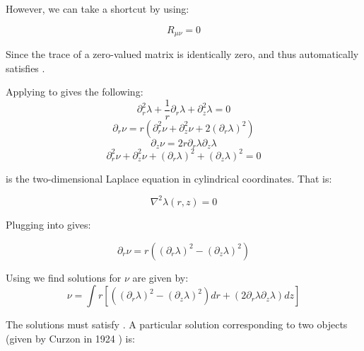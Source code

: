 \documentclass[12pt]{article}
\begin{document}
\begin{appendices}
However, we can take a shortcut by using:

\begin{equation}
R_{\mu\nu}=0
\label{eq:vacuum-solutions}
\end{equation}

Since the trace of a zero-valued matrix is identically zero, and thus  automatically satisfies .

Applying  to  gives the following:
\begin{equation}
\partial^{2}_{r}\lambda+\frac{1}{r}\partial_{r}\lambda+\partial^{2}_{z}\lambda=0\label{eq:laplace}
\end{equation}
\begin{equation}
\partial_{r}\nu=r\left(\partial^{2}_{r}\nu+\partial^{2}_{z}\nu+2\left(\partial_{r}\lambda\right)^{2}\right)\label{eq:R_rr=0}
\end{equation}
\begin{equation}
\partial_{z}\nu=2r\partial_{r}\lambda\partial_{z}\lambda\label{eq:nu_z}
\end{equation}
\begin{equation}
\partial^{2}_{r}\nu+\partial^{2}_{z}\nu+\left(\partial_{r}\lambda\right)^{2}+\left(\partial_{z}\lambda\right)^{2}=0\label{eq:R_phiphi=0}
\end{equation}

 is the two-dimensional Laplace equation in cylindrical coordinates. That is:

\begin{equation}
\nabla^2\lambda(r,z)=0
\end{equation}

Plugging  into  gives:

\begin{equation}
\partial_{r}\nu=r\left(\left(\partial_{r}\lambda\right)^{2}-\left(\partial_{z}\lambda\right)^{2}\right)\label{eq:nu_r}
\end{equation}

Using  we find solutions for $\nu$ are given by:
\begin{equation}
\nu=\int r[\left(\left(\partial_{r}\lambda\right)^{2}-\left(\partial_{z}\lambda\right)^{2}\right)dr+\left(2\partial_{r}\lambda\partial_{z}\lambda\right)dz]
\end{equation}

The solutions must satisfy . A particular solution corresponding to two objects (given by Curzon in 1924 \cite{curzon1924} ) is:


\end{appendices}
\end{document}
